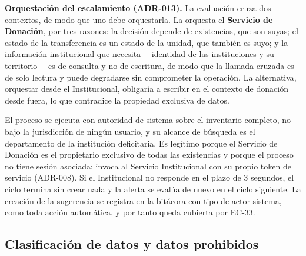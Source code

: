 \documentclass[11pt,a4paper]{article}
\begin{document}
\noindent\textbf{Orquestación del escalamiento (ADR-013).} La evaluación cruza dos contextos, de modo que uno debe orquestarla. La orquesta el \textbf{Servicio de Donación}, por tres razones: la decisión depende de existencias, que son suyas; el estado de la transferencia es un estado de la unidad, que también es suyo; y la información institucional que necesita ---identidad de las instituciones y su territorio--- es de consulta y no de escritura, de modo que la llamada cruzada es de solo lectura y puede degradarse sin comprometer la operación. La alternativa, orquestar desde el Institucional, obligaría a escribir en el contexto de donación desde fuera, lo que contradice la propiedad exclusiva de datos.

\vspace{0.2cm}
\noindent El proceso se ejecuta con autoridad de sistema sobre el inventario completo, no bajo la jurisdicción de ningún usuario, y su alcance de búsqueda es el departamento de la institución deficitaria. Es legítimo porque el Servicio de Donación es el propietario exclusivo de todas las existencias y porque el proceso no tiene sesión asociada: invoca al Servicio Institucional con su propio token de servicio (ADR-008). Si el Institucional no responde en el plazo de 3 segundos, el ciclo termina sin crear nada y la alerta se evalúa de nuevo en el ciclo siguiente. La creación de la sugerencia se registra en la bitácora con tipo de actor sistema, como toda acción automática, y por tanto queda cubierta por EC-33.

\subsection{Clasificación de datos y datos prohibidos}
\end{document}
